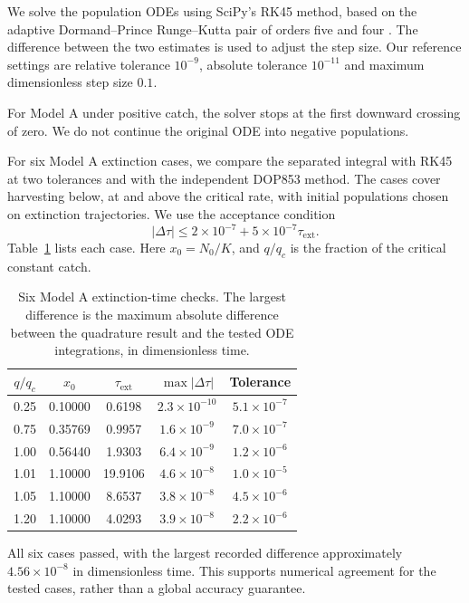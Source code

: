 We solve the population ODEs using SciPy's RK45
method, based on the adaptive Dormand--Prince
Runge--Kutta pair of orders five and four
\cite{dormand1980family,scipy_solve_ivp}.
The difference between the two estimates is used
to adjust the step size. Our reference settings
are relative tolerance $10^{-9}$, absolute
tolerance $10^{-11}$ and maximum dimensionless
step size $0.1$.

For Model A under positive catch, the solver
stops at the first downward crossing of zero.
We do not continue the original ODE into
negative populations.

For six Model A extinction cases, we compare
the separated integral with RK45 at two tolerances
and with the independent DOP853 method. The cases
cover harvesting below, at and above the critical
rate, with initial populations chosen on
extinction trajectories. We use the acceptance
condition
\[
|\Delta\tau|
\le 2\times10^{-7}
+5\times10^{-7}\tau_{\mathrm{ext}}.
\]
Table~\ref{tab:event_checks} lists each case.
Here $x_0=N_0/K$, and $q/q_c$ is the fraction
of the critical constant catch.

\begin{table}[htbp]
\centering
\footnotesize
\setlength{\tabcolsep}{4pt}
\caption{Six Model A extinction-time checks.
The largest difference is the maximum absolute
difference between the quadrature result and
the tested ODE integrations, in dimensionless time.}
\label{tab:event_checks}
\begin{tabular}{ccccc}
\toprule
$q/q_c$ & $x_0$ & $\tau_{\mathrm{ext}}$
& $\max|\Delta\tau|$ & Tolerance\\
\midrule
0.25 & 0.10000 & 0.6198 & $2.3\times10^{-10}$ & $5.1\times10^{-7}$\\
0.75 & 0.35769 & 0.9957 & $1.6\times10^{-9}$ & $7.0\times10^{-7}$\\
1.00 & 0.56440 & 1.9303 & $6.4\times10^{-9}$ & $1.2\times10^{-6}$\\
1.01 & 1.10000 & 19.9106 & $4.6\times10^{-8}$ & $1.0\times10^{-5}$\\
1.05 & 1.10000 & 8.6537 & $3.8\times10^{-8}$ & $4.5\times10^{-6}$\\
1.20 & 1.10000 & 4.0293 & $3.9\times10^{-8}$ & $2.2\times10^{-6}$\\
\bottomrule
\end{tabular}
\end{table}

All six cases passed, with the largest recorded
difference approximately $4.56\times10^{-8}$
in dimensionless time. This supports numerical
agreement for the tested cases, rather than a
global accuracy guarantee.


